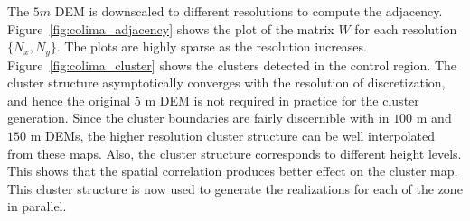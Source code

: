 The $5m$  DEM is downscaled to different resolutions to compute the adjacency.
Figure~\ref{fig:colima_adjacency} shows the plot of the matrix $W$ for each resolution $\lbrace N_x, N_y\rbrace$. The plots are highly sparse as the resolution increases. Figure~\ref{fig:colima_cluster} shows the clusters detected in the control region. The cluster structure asymptotically converges with the resolution of discretization, and hence the original $5$ m DEM is not required in practice for the cluster generation. Since the cluster boundaries are fairly discernible with in $100$ m and $150$ m DEMs, the higher resolution cluster structure can be well interpolated from these maps. Also, the cluster structure corresponds to different height levels. This shows that the spatial correlation produces better effect on the cluster map. This cluster structure is now used to generate the realizations for each of the zone in parallel. 

